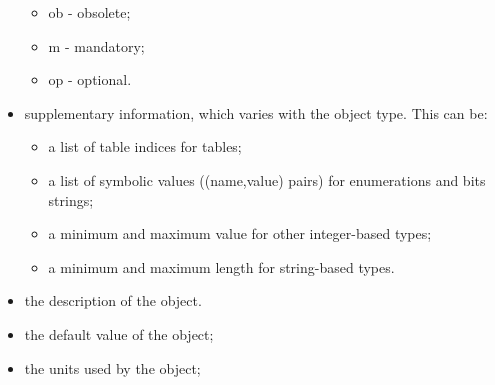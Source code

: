 \begin{itemize}
\begin{itemize}
\item ob - obsolete;
\item m - mandatory;
\item op - optional.
\end{itemize}
\item supplementary information, which varies with the object type.
This can be:
\begin{itemize}
\item a list of table indices for tables;
\item a list of symbolic values ((name,value) pairs) for enumerations
and bits strings;
\item a minimum and maximum value for other integer-based types;
\item a minimum and maximum length for string-based types.
\end{itemize}
\item the description of the object.
\item the default value of the object;
\item the units used by the object;
\end{itemize}



